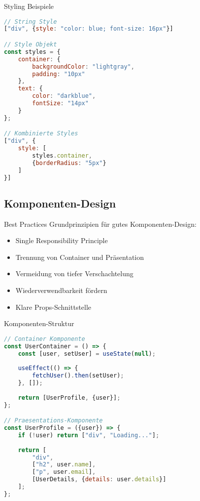 \begin{KR}{Styling Beispiele}
\begin{lstlisting}[language=JavaScript, style=basesmol]
// String Style
["div", {style: "color: blue; font-size: 16px"}]

// Style Objekt
const styles = {
    container: {
        backgroundColor: "lightgray",
        padding: "10px"
    },
    text: {
        color: "darkblue",
        fontSize: "14px"
    }
};

// Kombinierte Styles
["div", {
    style: [
        styles.container,
        {borderRadius: "5px"}
    ]
}]
\end{lstlisting}
\end{KR}

\subsection{Komponenten-Design}

\begin{theorem}{Best Practices}
    Grundprinzipien für gutes Komponenten-Design:
    \begin{itemize}
        \item Single Responsibility Principle
        \item Trennung von Container und Präsentation
        \item Vermeidung von tiefer Verschachtelung
        \item Wiederverwendbarkeit fördern
        \item Klare Props-Schnittstelle
    \end{itemize}
\end{theorem}

\begin{KR}{Komponenten-Struktur}
\begin{lstlisting}[language=JavaScript, style=basesmol]
// Container Komponente
const UserContainer = () => {
    const [user, setUser] = useState(null);
    
    useEffect(() => {
        fetchUser().then(setUser);
    }, []);
    
    return [UserProfile, {user}];
};

// Praesentations-Komponente
const UserProfile = ({user}) => {
    if (!user) return ["div", "Loading..."];
    
    return [
        "div",
        ["h2", user.name],
        ["p", user.email],
        [UserDetails, {details: user.details}]
    ];
};
\end{lstlisting}
\end{KR}

